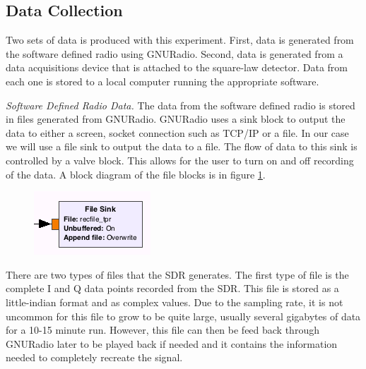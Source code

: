\subsection{Data Collection}\label{exp1_data}

Two sets of data is produced with this experiment.  First, data is generated from the software defined radio using GNURadio.  Second, data is generated from a data acquisitions device that is attached to the square-law detector.  Data from each one is stored to a local computer running the appropriate software.

\emph{Software Defined Radio Data.  }The data from the software defined radio is stored in files generated from GNURadio.  GNURadio uses a sink block to output the data to either a screen, socket connection such as TCP/IP or a file.  In our case we will use a file sink to output the data to a file.  The flow of data to this sink is controlled by a valve block.  This allows for the user to turn on and off recording of the data.  A block diagram of the file blocks is in figure \ref{filesink}.

{\begin{figure}[h!tb] \centering
\includegraphics[width=\textwidth]{Images/TPR_Filesink.png}
\label{filesink}
\end{figure}
}

There are two types of files that the SDR generates.  The first type of file is the complete I and Q data points recorded from the SDR.  This file is stored as a little-indian format and as complex values.  Due to the sampling rate, it is not uncommon for this file to grow to be quite large, usually several gigabytes of data for a 10-15 minute run.  However, this file can then be feed back through GNURadio later to be played back if needed and it contains the information needed to completely recreate the signal.

